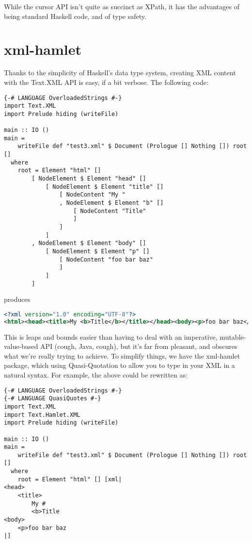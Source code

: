 
While the cursor API isn't quite as succinct as XPath, it has the advantages of being standard Haskell code, and of type safety.

\section{xml-hamlet}

Thanks to the simplicity of Haskell's data type system, creating XML content with the Text.XML API is easy, if a bit verbose. The following code:

\begin{lstlisting}
{-# LANGUAGE OverloadedStrings #-}
import Text.XML
import Prelude hiding (writeFile)

main :: IO ()
main =
    writeFile def "test3.xml" $ Document (Prologue [] Nothing []) root []
  where
    root = Element "html" []
        [ NodeElement $ Element "head" []
            [ NodeElement $ Element "title" []
                [ NodeContent "My "
                , NodeElement $ Element "b" []
                    [ NodeContent "Title"
                    ]
                ]
            ]
        , NodeElement $ Element "body" []
            [ NodeElement $ Element "p" []
                [ NodeContent "foo bar baz"
                ]
            ]
        ]
\end{lstlisting}

produces

\begin{lstlisting}[language=XML]
<?xml version="1.0" encoding="UTF-8"?>
<html><head><title>My <b>Title</b></title></head><body><p>foo bar baz</p></body></html>
\end{lstlisting}

This is leaps and bounds easier than having to deal with an imperative, mutable-value-based API (cough, Java, cough), but it's far from pleasant, and obscures what we're really trying to achieve. To simplify things, we have the xml-hamlet package, which using Quasi-Quotation to allow you to type in your XML in a natural syntax. For example, the above could be rewritten as:

\begin{lstlisting}
{-# LANGUAGE OverloadedStrings #-}
{-# LANGUAGE QuasiQuotes #-}
import Text.XML
import Text.Hamlet.XML
import Prelude hiding (writeFile)

main :: IO ()
main =
    writeFile def "test3.xml" $ Document (Prologue [] Nothing []) root []
  where
    root = Element "html" [] [xml|
<head>
    <title>
        My #
        <b>Title
<body>
    <p>foo bar baz
|]
\end{lstlisting}%

